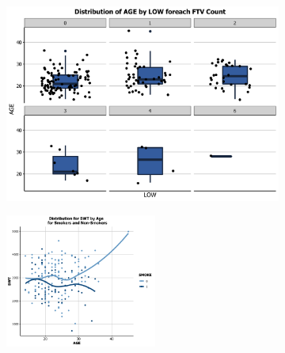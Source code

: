 \vspace{0.5cm}
\begin{figure}[!htb]
        \centering
        \begin{subfigure}[b]{0.4\textwidth}
            \centering
            \includegraphics[width=\textwidth]{Images/AgeFtv.png}
        \end{subfigure}
        \quad
        \begin{subfigure}[b]{0.4\textwidth}  
            \centering 
            \includegraphics[width=\textwidth, height=4.4cm]{Images/AgevsSmoke_Magda.png}
        \end{subfigure}
        
        \hfill
        

\end{figure}
